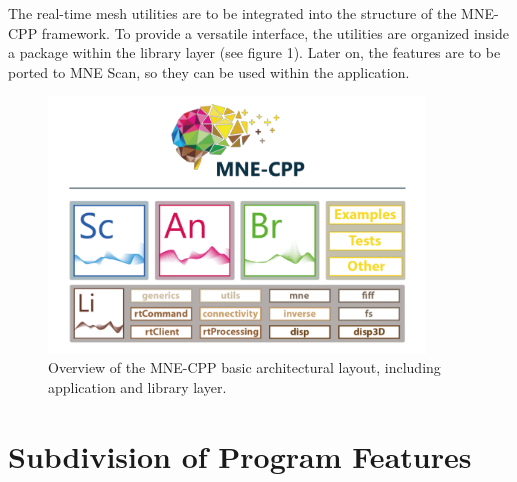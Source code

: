 The real-time mesh utilities are to be integrated into the structure of the MNE-CPP framework. To provide a versatile interface, the utilities are organized inside a package within the library layer (see figure 1). Later on, the features are to be ported to MNE Scan, so they can be used within the application.
\begin{figure}[h]
	\begin{center}
		\includegraphics[width=10cm]{figures/mne_architecture.png}
		\caption{Overview of the MNE-CPP basic architectural layout, including application and library layer.}
	\end{center}
\end{figure}

\clearpage

\section{Subdivision of Program Features}

